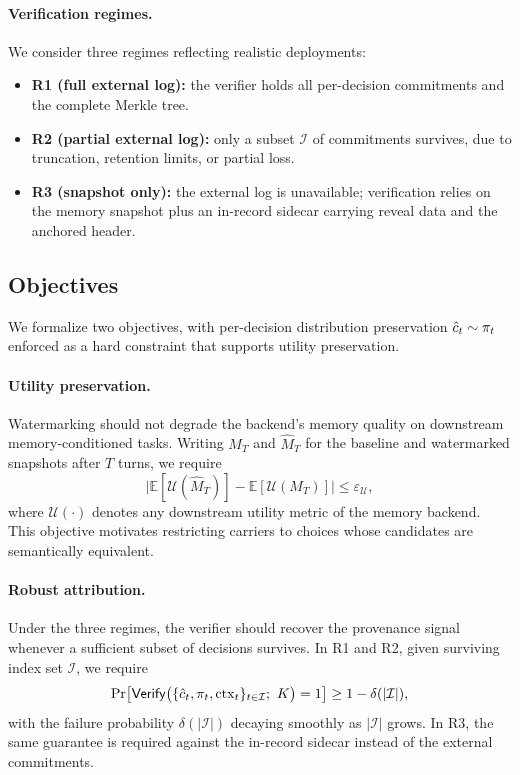 \paragraph{Verification regimes.}
We consider three regimes reflecting realistic deployments:
\begin{itemize}
  \item \textbf{R1 (full external log):} the verifier holds all
  per-decision commitments and the complete Merkle tree.
  \item \textbf{R2 (partial external log):} only a subset $\mathcal{I}$ of
  commitments survives, due to truncation, retention limits, or partial
  loss.
  \item \textbf{R3 (snapshot only):} the external log is unavailable;
  verification relies on the memory snapshot plus an in-record sidecar
  carrying reveal data and the anchored header.
\end{itemize}

\subsection{Objectives}
\label{sec:problem-objectives}
We formalize two objectives, with per-decision distribution preservation
$\hat c_t\sim\pi_t$ enforced as a hard constraint that supports
utility preservation.

\paragraph{Utility preservation.}
Watermarking should not degrade the backend's memory quality on
downstream memory-conditioned tasks. Writing $M_T$ and $\hat M_T$ for the
baseline and watermarked snapshots after $T$ turns, we require
\begin{equation}
\Big|\mathbb{E}[\mathcal{U}(\hat M_T)] - \mathbb{E}[\mathcal{U}(M_T)]\Big|
\le \varepsilon_{\mathcal{U}},
\end{equation}
where $\mathcal{U}(\cdot)$ denotes any downstream utility metric of the
memory backend. This objective motivates restricting carriers to choices
whose candidates are semantically equivalent.

\paragraph{Robust attribution.}
Under the three regimes, the verifier should recover the provenance signal
whenever a sufficient subset of decisions survives. In R1 and R2, given
surviving index set $\mathcal{I}$, we require
\begin{equation}
\Pr\!\left[\mathsf{Verify}\big(\{\hat c_t,\pi_t,\mathrm{ctx}_t\}_{t\in\mathcal{I}};\ K\big)=1\right]
\ge 1-\delta(|\mathcal{I}|),
\end{equation}
with the failure probability $\delta(|\mathcal{I}|)$ decaying smoothly as
$|\mathcal{I}|$ grows. In R3, the same guarantee is required against the
in-record sidecar instead of the external commitments.


